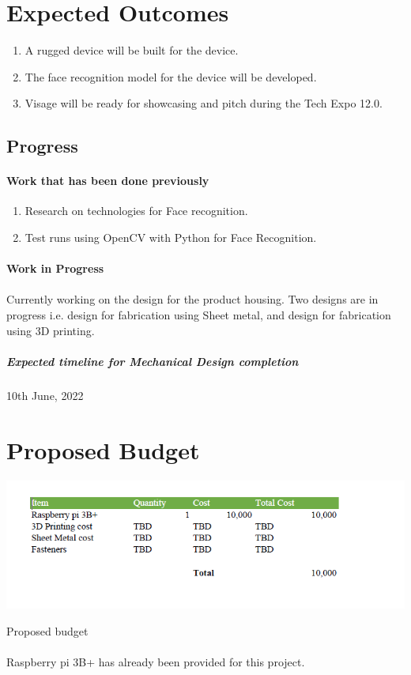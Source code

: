 \section{Expected Outcomes}
\begin{enumerate}
\item A rugged device will be built for the device.
\item The face recognition model for the device will be developed.
\item Visage will be ready for showcasing and pitch during the Tech Expo 12.0.
\end{enumerate}
\subsection{Progress}
\paragraph{Work that has been done previously}
\begin{enumerate}
	\item Research on technologies for Face recognition.
	\item Test runs using OpenCV with Python for Face Recognition.
\end{enumerate}
\paragraph{Work in Progress}
\paragraph{} Currently working on the design for the product housing. Two designs are in progress i.e. design for fabrication using Sheet metal, and design for fabrication using 3D printing.
\subparagraph{Expected timeline for Mechanical Design completion}
\paragraph{} 10th June, 2022
\newpage
\section{Proposed Budget}
\begin{table}[!h]
\includegraphics{Figures/Visage4}
\caption{Proposed budget}
\paragraph{}Raspberry pi 3B+ has already been provided for this project.
\end{table}
\newpage
